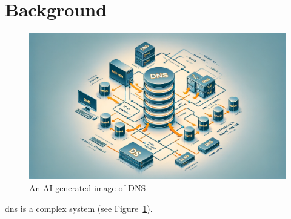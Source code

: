 \section{Background} \label{sec:background}

\begin{figure}[!h]
    \centering
    \includegraphics[width=.5\textwidth]{img/dns.png}
    \caption{An AI generated image of DNS}
    \label{fig:dns}
\end{figure}

\ac{dns} is a complex system (see Figure~\ref{fig:dns}).

